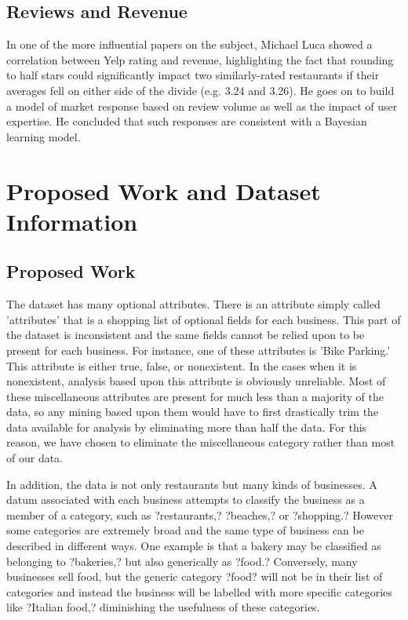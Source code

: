 \subsection{Reviews and Revenue}

In one of the more influential papers on the subject, Michael Luca showed a correlation between Yelp rating and revenue, highlighting the fact that rounding to half stars could significantly impact two similarly-rated restaurants if their averages fell on either side of the divide (e.g. 3.24 and 3.26). He goes on to build a model of market response based on review volume as well as the impact of user expertise. He concluded that such responses are consistent with a Bayesian learning model.

\section{Proposed Work and Dataset Information}

\subsection{Proposed Work}

The dataset has many optional attributes. There is an attribute simply called 'attributes' that is a shopping list of optional fields for each business. This part of the dataset is inconsistent and the same fields cannot be relied upon to be present for each business. For instance, one of these attributes is 'Bike Parking.' This attribute is either true, false, or nonexistent. In the cases when it is nonexistent, analysis based upon this attribute is obviously unreliable. Most of these miscellaneous attributes are present for much less than a majority of the data, so any mining based upon them would have to first drastically trim the data available for analysis by eliminating more than half the data. For this reason, we have chosen to eliminate the miscellaneous category rather than most of our data.

\quad In addition, the data is not only restaurants but many kinds of businesses. A datum associated with each business attempts to classify the business as a member of a category, such as ?restaurants,? ?beaches,? or ?shopping.? However some categories are extremely broad and the same type of business can be described in different ways. One example is that a bakery may be classified as belonging to ?bakeries,? but also generically as ?food.? Conversely, many businesses sell food, but the generic category ?food? will not be in their list of categories and instead the business will be labelled with more specific categories like ?Italian food,? diminishing the usefulness of these categories.

